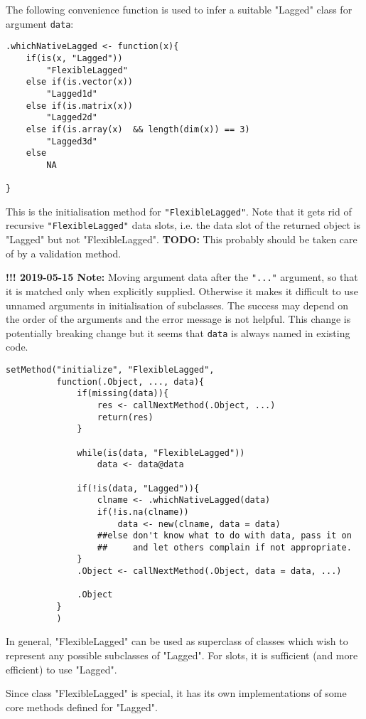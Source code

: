 \documentclass[11pt,a4paper]{article}
\begin{document}
The following convenience function is used to infer a suitable "Lagged" class for argument
\texttt{data}:
\begin{verbatim}
.whichNativeLagged <- function(x){
    if(is(x, "Lagged"))
        "FlexibleLagged"
    else if(is.vector(x))
        "Lagged1d"
    else if(is.matrix(x))
        "Lagged2d"
    else if(is.array(x)  && length(dim(x)) == 3)
        "Lagged3d"
    else
        NA

}
\end{verbatim}


This is the initialisation method for \texttt{"FlexibleLagged"}. Note that it gets rid of recursive
\texttt{"FlexibleLagged"} data slots, i.e. the data slot of the returned object is "Lagged" but not
"FlexibleLagged".  \textbf{TODO:} This probably should be taken care of by a validation method.

\textbf{!!! 2019-05-15 Note:} Moving argument data after the \texttt{"..."} argument, so that it is matched
     only when explicitly supplied. Otherwise it makes it difficult to use unnamed arguments
     in initialisation of subclasses. The success may depend on the order of the arguments
     and the error message is not helpful. This change is potentially breaking change but it
     seems that \texttt{data} is always named in existing code.
\begin{verbatim}
setMethod("initialize", "FlexibleLagged",
          function(.Object, ..., data){
              if(missing(data)){
                  res <- callNextMethod(.Object, ...)
                  return(res)
              }

              while(is(data, "FlexibleLagged"))
                  data <- data@data

              if(!is(data, "Lagged")){
                  clname <- .whichNativeLagged(data)
                  if(!is.na(clname))
                      data <- new(clname, data = data)
                  ##else don't know what to do with data, pass it on
                  ##     and let others complain if not appropriate.
              }
              .Object <- callNextMethod(.Object, data = data, ...)

              .Object
          }
          )
\end{verbatim}
In general, "FlexibleLagged" can be used as superclass of classes which wish to represent any
possible subclasses of "Lagged". For slots, it is sufficient (and more efficient) to use
"Lagged".

Since class "FlexibleLagged" is special, it has its own implementations of some core methods
defined for "Lagged".
\end{document}
